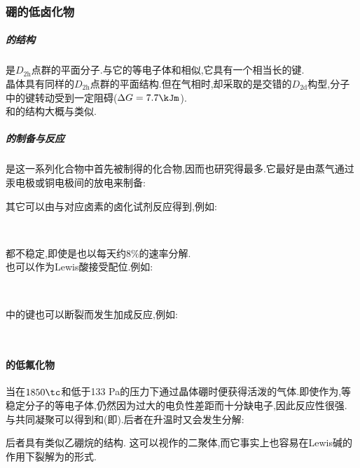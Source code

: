 \documentclass{ctexart}
\begin{document}
\subsubsection{硼的低卤化物}
\paragraph{}
\subparagraph{的结构}
是$D_{2\text{h}}$点群的平面分子.与它的等电子体和相似,它具有一个相当长的键.\\
\indent {}晶体具有同样的$D_{2\text{h}}$点群的平面结构.但在气相时,却采取的是交错的$D_{2\text{d}}$构型,分子中的键转动受到一定阻碍($\Delta G=7.7\kJm$).\\
\indent {}和的结构大概与类似.
\subparagraph{的制备与反应}
是这一系列化合物中首先被制得的化合物,因而也研究得最多.它最好是由蒸气通过汞电极或铜电极间的放电来制备:
\begin{center}
\end{center}
其它可以由与对应卤素的卤化试剂反应得到,例如:
\begin{center}
    \\
\end{center}
\indent {}都不稳定,即使是也以每天约$8\%$的速率分解.\\
\indent {}也可以作为Lewis酸接受配位.例如:
\begin{center}
    \\
\end{center}
\indent {}中的键也可以断裂而发生加成反应,例如:
\begin{center}
    \\
\end{center}
\paragraph{的低氟化物}
当在$1850\tc$和低于133 Pa的压力下通过晶体硼时便获得活泼的气体.即使作为,等稳定分子的等电子体,仍然因为过大的电负性差距而十分缺电子,因此反应性很强.\\
\indent {}与共同凝聚可以得到和(即).后者在升温时又会发生分解:
\begin{center}
\end{center}
后者具有类似乙硼烷的结构.
这可以视作的二聚体,而它事实上也容易在Lewis碱的作用下裂解为的形式.
\end{document}
